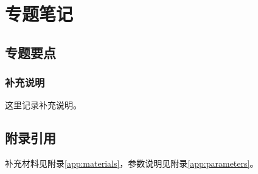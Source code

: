 \chapter{专题笔记}
\label{chap:chapter7}

\section{专题要点}
\subsection{补充说明}
这里记录补充说明。

\section{附录引用}
补充材料见附录\ref{app:materials}，参数说明见附录\ref{app:parameters}。
